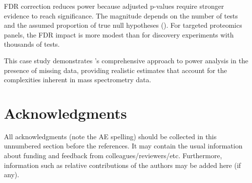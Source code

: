 \documentclass[article]{jss}
\begin{document}
FDR correction reduces power because adjusted p-values require stronger evidence to reach significance. The magnitude depends on the number of tests and the assumed proportion of true null hypotheses (). For targeted proteomics panels, the FDR impact is more modest than for discovery experiments with thousands of tests.

This case study demonstrates 's comprehensive approach to power analysis in the presence of missing data, providing realistic estimates that account for the complexities inherent in mass spectrometry data.


\section*{Acknowledgments}

\begin{leftbar}
All acknowledgments (note the AE spelling) should be collected in this
unnumbered section before the references. It may contain the usual information
about funding and feedback from colleagues/reviewers/etc. Furthermore,
information such as relative contributions of the authors may be added here
(if any).
\end{leftbar}







\newpage
\end{document}

